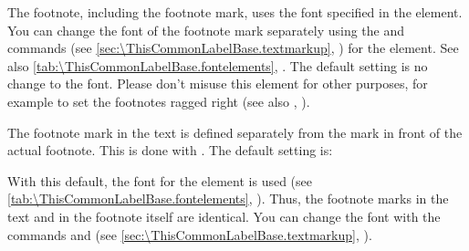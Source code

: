 \BeginIndexGroup
{}%
%
The footnote, including the footnote mark, uses the font specified in the
 element. You can
change the font of the footnote mark separately using the
 and
 commands (see
\autoref{sec:\ThisCommonLabelBase.textmarkup},
)
for the 
element. See also \autoref{tab:\ThisCommonLabelBase.fontelements},
.
The default setting is no change to the font.%
 Please don't misuse this element for other purposes, for example to set
the footnotes ragged right (see also ,
).

%
%
The footnote mark in the text is defined separately from the mark in front of
the actual footnote. This is done with . The default
setting
 is:
\begin{lstcode}
\end{lstcode}
With this default, the font for the
element is used (see \autoref{tab:\ThisCommonLabelBase.fontelements},
). Thus, the footnote marks
in the text and in the footnote itself are identical. You can change the font
with the commands  and
 (see
\autoref{sec:\ThisCommonLabelBase.textmarkup},
).

